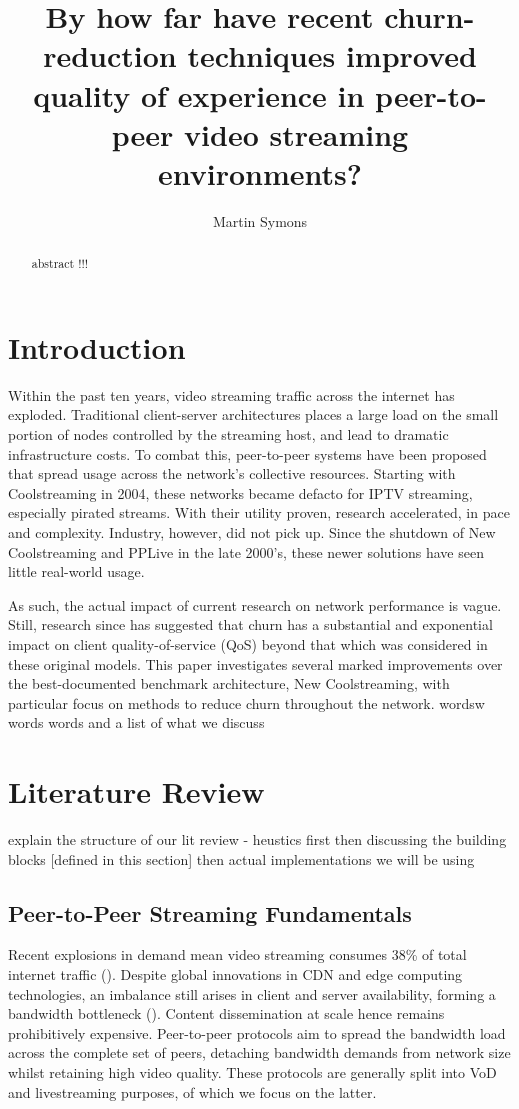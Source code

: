 \documentclass[12pt,a4paper]{article}
\title{By how far have recent churn-reduction techniques improved quality of experience in peer-to-peer video streaming environments?}
\author{Martin Symons}
\begin{document}
\maketitle

\begin{abstract}
abstract !!! 
\end{abstract}

\section{Introduction} \label{introduction}
Within the past ten years, video streaming traffic across the internet has exploded. Traditional client-server architectures places a large load on the small portion of nodes controlled by the streaming host, and lead to dramatic infrastructure costs. To combat this, peer-to-peer systems have been proposed that spread usage across the network's collective resources. Starting with Coolstreaming in 2004, these networks became defacto for IPTV streaming, especially pirated streams. With their utility proven, research accelerated, in pace and complexity. Industry, however, did not pick up. Since the shutdown of New Coolstreaming and PPLive in the late 2000's, these newer solutions have seen little real-world usage.

As such, the actual impact of current research on network performance is vague. Still, research since has suggested that churn has a substantial and exponential impact on client quality-of-service (QoS) beyond that which was considered in these original models. This paper investigates several marked improvements over the best-documented benchmark architecture, New Coolstreaming, with particular focus on methods to reduce churn throughout the network. wordsw words words and a list of what we discuss

\section{Literature Review}  \label{litreview}
explain the structure of our lit review - heustics first then discussing the building blocks [defined in this section] then actual implementations we will be using

\subsection{Peer-to-Peer Streaming Fundamentals} \label{litreview:fundamentals}
Recent explosions in demand mean video streaming consumes 38\% of total internet traffic (\cite{Sandvine2024}). Despite global innovations in CDN and edge computing technologies, an imbalance still arises in client and server availability, forming a bandwidth bottleneck (\cite{Ramzan2012}). Content dissemination at scale hence remains prohibitively expensive. Peer-to-peer protocols aim to spread the bandwidth load across the complete set of peers, detaching bandwidth demands from network size whilst retaining high video quality. These protocols are generally split into VoD and livestreaming purposes, of which we focus on the latter.
\end{document}
